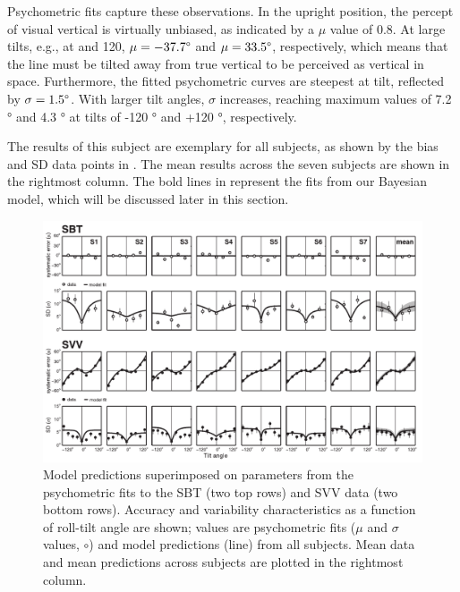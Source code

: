 Psychometric fits capture these observations. In the upright position, the percept of visual vertical is virtually unbiased, as indicated by a $\mu$ value of 0.8\textdegree. At large tilts, e.g., at  and 120\textdegree, $\mu = -37.7\degree$ and $\mu = 33.5\degree$, respectively, which means that the line must be tilted away from true vertical to be perceived as vertical in space. Furthermore, the fitted psychometric curves are steepest at  tilt, reflected by $\sigma = 1.5\degree$. With larger tilt angles, $\sigma$ increases, reaching maximum values of 7.2 \si{\degree} and 4.3 \si{\degree} at tilts of -120 \si{\degree} and +120 \si{\degree}, respectively.

The results of this subject are exemplary for all subjects, as shown by the bias and SD data points in . The mean results across the seven subjects are shown in the rightmost column. The bold lines in  represent the fits from our Bayesian model, which will be discussed later in this section.

\begin{figure}
	\includegraphics[width=1.0\textwidth]{src/paper1/figure4.pdf}

    \caption{Model predictions superimposed on parameters from the psychometric fits to the SBT (two top rows) and SVV data (two bottom rows). Accuracy and variability characteristics as a function of roll-tilt angle are shown; values are psychometric fits ($\mu$ and $\sigma$ values, $\circ$) and model predictions (line) from all subjects. Mean data and mean predictions across subjects are plotted in the rightmost column.}
    \label{p1:fig4}
\end{figure}

